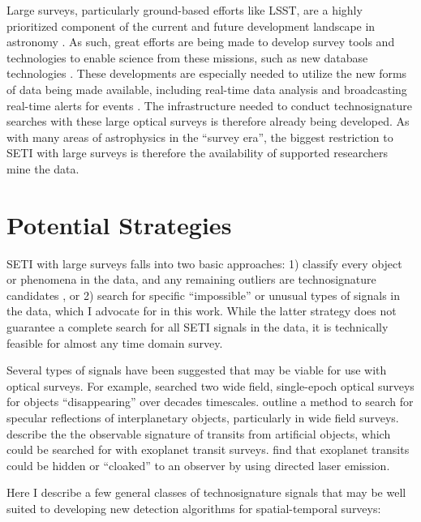 \documentclass[twocolumn]{aastex62}
\begin{document}
Large surveys, particularly ground-based efforts like LSST, are a highly prioritized component of the current and future development landscape in astronomy \citep{astro2010}. As such, great efforts are being made to develop survey tools and technologies to enable science from these missions, such as new database technologies \citep{juric2012}. These developments are especially needed to utilize the new forms of data being made available, including real-time data analysis \citep[e.g.][]{schwamb2019} and broadcasting real-time alerts for events \citep{patterson2019}.
The infrastructure needed to conduct technosignature searches with these large optical surveys is therefore already being developed. As with many areas of astrophysics in the ``survey era'', the biggest restriction to SETI with large surveys is therefore the availability of supported researchers mine the data.




\section{Potential Strategies}
\label{sec:strategy}

SETI with large surveys falls into two basic approaches: 1) classify every object or phenomena in the data, and any remaining outliers are technosignature candidates \citep{djorgovski2000}, or 2) search for specific ``impossible'' or unusual types of signals in the data, which I advocate for in this work. While the latter strategy does not guarantee a complete search for all SETI signals in the data, it is technically feasible for almost any time domain survey. 

Several types of signals have been suggested that may be viable for use with optical surveys. For example, \citet{villarroel2016} searched two wide field, single-epoch optical surveys for objects ``disappearing''  over decades timescales. \citet{lacki2019} outline a method to search for specular reflections of interplanetary objects, particularly in wide field surveys. \citet{arnold2005} describe the the observable signature of transits from artificial objects, which could be searched for with exoplanet transit surveys. \citet{kipping2016} find that exoplanet transits could be hidden or ``cloaked'' to an observer by using directed laser emission.

Here I describe a few general classes of technosignature signals that may be well suited to developing new detection algorithms for spatial-temporal surveys:
\end{document}
